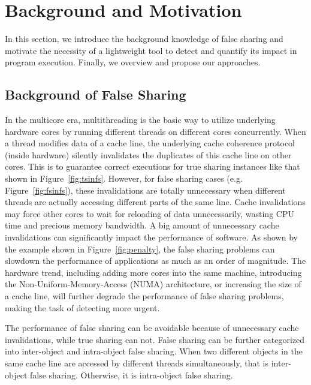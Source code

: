\section{Background and Motivation}

\label{sec:overview}

In this section, we introduce the background knowledge of false sharing 
and motivate the necessity of a lightweight tool to detect and quantify its impact in program execution. Finally, we overview \cheetah{} and propose our approaches.

\subsection{Background of False Sharing}
\label{sec:background}

In the multicore era, multithreading is the basic way to utilize underlying hardware cores by running different threads on different cores concurrently. When a thread modifies data of a cache line, the underlying cache coherence protocol (inside hardware) silently invalidates the duplicates of this cache line on other cores. This is to guarantee correct executions for true sharing instances like that shown in Figure~\ref{fig:tsinfs}. However, for false sharing cases (e.g. Figure~\ref{fig:fsinfs}), these invalidations are totally unnecessary when different threads are actually accessing different parts of the same line. Cache invalidations may force other cores to wait for reloading of data unnecessarily, wasting CPU time and precious memory bandwidth. A big amount of unnecessary cache invalidations can significantly impact the performance of software. As shown by the example shown in Figure~\ref{fig:penalty}, the false sharing problems can slowdown the performance of applications as much as an order of magnitude. The hardware trend, including adding more cores into the same machine, introducing the Non-Uniform-Memory-Access (NUMA) architecture, or increasing the size of a cache line, will further degrade the performance of false sharing problems, making the task of detecting more urgent. 

The performance of false sharing can be avoidable because of unnecessary cache invalidations, while true sharing can not. False sharing can be further categorized into inter-object and intra-object false sharing. When two different objects in the same cache line are accessed by different threads simultaneously, that is inter-object false sharing. Otherwise, it is intra-object false sharing.  %

